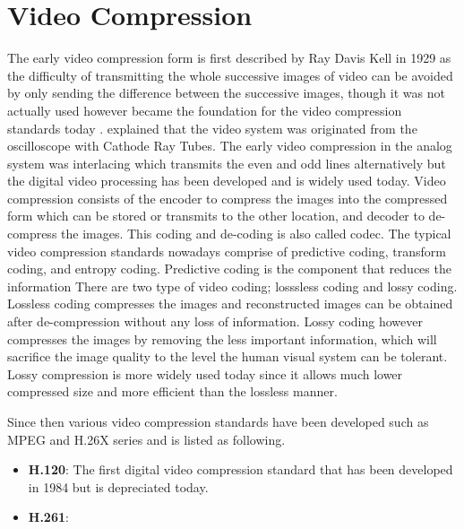 \section{Video Compression}
\label{sec:introduction/section_b}

The early video compression form is first described by Ray Davis Kell in 1929 as the difficulty of transmitting the whole successive images of video can be avoided by only sending the difference between the successive images, though it was not actually used however became the foundation for the video compression standards today \cite{jacobs_brief_2009}. \citeauthor{jacobs_brief_2009} explained that the video system was originated from the oscilloscope with Cathode Ray Tubes. The early video compression in the analog system was interlacing which transmits the even and odd lines alternatively but the digital video processing has been developed and is widely used today. Video compression consists of the encoder to compress the images into the compressed form which can be stored or transmits to the other location, and decoder to de-compress the images. This coding and de-coding is also called codec. The typical video compression standards nowadays comprise of predictive coding, transform coding, and entropy coding. Predictive coding is the component that reduces the information
There are two type of video coding; losssless coding and lossy coding. Lossless coding compresses the images and reconstructed images can be obtained after de-compression without any loss of information. Lossy coding however compresses the images by removing the less important information, which will sacrifice the image quality to the level the human visual system can be tolerant. Lossy compression is more widely used today since it allows much lower compressed size and more efficient than the lossless manner.




Since then various video compression standards have been developed such as MPEG and H.26X series \cite{zhang_overview_2019} and is listed as following.

\begin{itemize}

\item \textbf{H.120}: The first digital video compression standard that has been developed in 1984 but is depreciated today.

\item \textbf{H.261}: 


\end{itemize}


